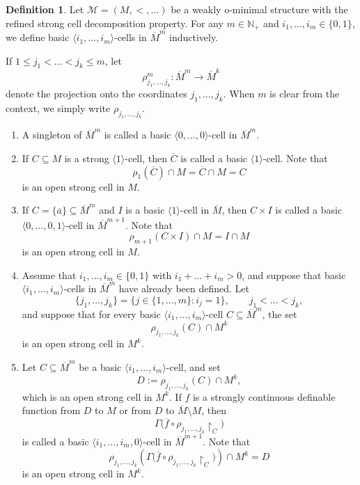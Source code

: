 \documentclass{amsart}
\theoremstyle{definition}
\newtheorem{definition}{Definition}[section]
\theoremstyle{plain}
\newcommand{\N}{\mathbb{N}}
\begin{document}
\begin{definition}
	Let $\mathcal M = (M, <, \ldots)$ be a weakly o-minimal structure with the refined strong cell decomposition property.
	For any $m \in \N_{+}$ and $i_1, \dots, i_m \in \{0,1\}$, we define basic $\langle i_1, \dots, i_m \rangle$-cells in $\overline{M}^m$ inductively.
	
	If $1 \leq j_1 < \dots < j_k \leq m$, let
	\[
	\rho^m_{j_1, \dots, j_k} : \overline{M}^m \to \overline{M}^k
	\]
	denote the projection onto the coordinates $j_1, \dots, j_k$.
	When $m$ is clear from the context, we simply write $\rho_{j_1, \dots, j_k}$.
	
	\begin{enumerate}
		\item
		A singleton of $\overline{M}^m$ is called a basic $\langle 0, \dots, 0 \rangle$-cell in $\overline{M}^m$.
		
		\item
		If $C \subseteq M$ is a strong $\langle 1 \rangle$-cell, then $\overline{C}$ is called a basic $\langle 1 \rangle$-cell.
		Note that
		\[
		\rho_1(\overline{C}) \cap M = \overline{C} \cap M = C
		\]
		is an open strong cell in $M$.
		
		\item
		If $C = \{ \overline{a} \} \subseteq \overline{M}^m$ and $I$ is a basic $\langle 1 \rangle$-cell in $\overline{M}$,
		then $C \times I$ is called a basic $\langle 0, \dots, 0, 1 \rangle$-cell in $\overline{M}^{m+1}$.
		Note that
		\[
		\rho_{m+1}(C \times I) \cap M = I \cap M
		\]
		is an open strong cell in $M$.
		
		\item[]
		Assume that $i_1, \dots, i_m \in \{0,1\}$ with $i_1 + \dots + i_m > 0$, and suppose that basic
		$\langle i_1, \dots, i_m \rangle$-cells in $\overline{M}^m$ have already been defined.
		Let
		\[
		\{ j_1, \dots, j_k \} = \{ j \in \{1, \dots, m\} : i_j = 1 \},
		\qquad j_1 < \dots < j_k,
		\]
		and suppose that for every basic $\langle i_1, \dots, i_m \rangle$-cell
		$C \subseteq \overline{M}^m$, the set
		\[
		\rho_{j_1, \dots, j_k}(C) \cap M^k
		\]
		is an open strong cell in $M^k$.
		
		\item
		Let $C \subseteq \overline{M}^m$ be a basic $\langle i_1, \dots, i_m \rangle$-cell, and set
		\[
		D := \rho_{j_1, \dots, j_k}(C) \cap M^k,
		\]
		which is an open strong cell in $M^k$.
		If $f$ is a strongly continuous definable function from $D$ to $M$
		or from $D$ to $\overline{M} \setminus M$,
		then
		\[
		\Gamma\bigl(\overline{f} \circ \rho_{j_1, \dots, j_k}\!\restriction_C \bigr)
		\]
		is called a basic $\langle i_1, \dots, i_m, 0 \rangle$-cell in $\overline{M}^{m+1}$.
		Note that
		\[
		\rho_{j_1, \dots, j_k}\!\left(
		\Gamma\bigl(\overline{f} \circ \rho_{j_1, \dots, j_k}\!\restriction_C \bigr)
		\right) \cap M^k = D
		\]
		is an open strong cell in $M^k$.
		

\end{enumerate}
\end{definition}
\end{document}
